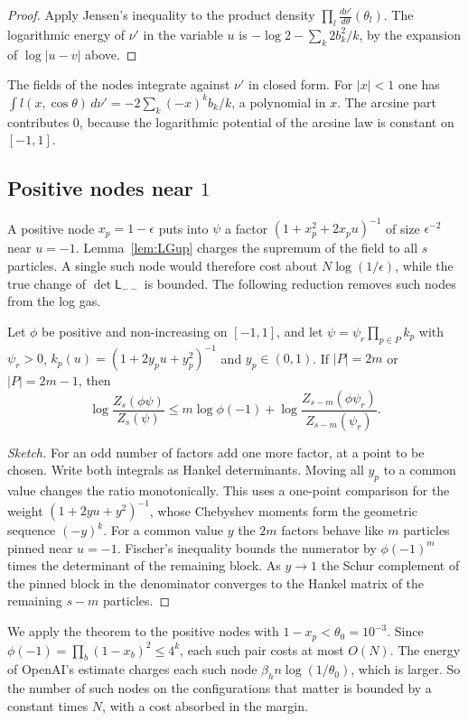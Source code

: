 \begin{proof}
Apply Jensen's inequality to the product density $\prod_l\frac{d\nu'}{d\theta}(\theta_l)$. The logarithmic
energy of $\nu'$ in the variable $u$ is $-\log2-\sum_k2b_k^2/k$, by the expansion of $\log|u-v|$ above.
\end{proof}

The fields of the nodes integrate against $\nu'$ in closed form. For $|x|<1$ one has
$\int l(x,\cos\theta)\,d\nu'=-2\sum_k(-x)^kb_k/k$, a polynomial in $x$. The arcsine part contributes $0$,
because the logarithmic potential of the arcsine law is constant on $[-1,1]$.

\subsection{Positive nodes near $1$}\label{ssec:spikes}
A positive node $x_p=1-\epsilon$ puts into $\psi$ a factor $(1+x_p^2+2x_pu)^{-1}$ of size $\epsilon^{-2}$ near
$u=-1$. Lemma~\ref{lem:LGup} charges the supremum of the field to all $s$ particles. A single such node
would therefore cost about $N\log(1/\epsilon)$, while the true change of $\det\mathsf L_{--}$ is bounded. The
following reduction removes such nodes from the log gas.

\begin{theorem}\label{thm:spike}
Let $\phi$ be positive and non-increasing on $[-1,1]$, and let $\psi=\psi_r\prod_{p\in P}k_p$ with $\psi_r>0$,
$k_p(u)=(1+2y_pu+y_p^2)^{-1}$ and $y_p\in(0,1)$. If $|P|=2m$ or $|P|=2m-1$, then
\[
 \log\frac{Z_s(\phi\psi)}{Z_s(\psi)}\le m\log\phi(-1)+\log\frac{Z_{s-m}(\phi\psi_r)}{Z_{s-m}(\psi_r)} .
\]
\end{theorem}

\begin{proof}[Sketch]
For an odd number of factors add one more factor, at a point to be chosen. Write both integrals as Hankel
determinants. Moving all $y_p$ to a common value changes the ratio monotonically. This uses a one-point
comparison for the weight $(1+2yu+y^2)^{-1}$, whose Chebyshev moments form the geometric sequence $(-y)^k$.
For a common value $y$ the $2m$ factors behave like $m$ particles pinned near $u=-1$. Fischer's inequality
bounds the numerator by $\phi(-1)^m$ times the determinant of the remaining block. As $y\to1$ the Schur
complement of the pinned block in the denominator converges to the Hankel matrix of the remaining
$s-m$ particles.
\end{proof}

We apply the theorem to the positive nodes with $1-x_p<\theta_0=10^{-3}$. Since $\phi(-1)=\prod_b(1-x_b)^2\le
4^k$, each such pair costs at most $O(N)$. The energy of OpenAI's estimate charges each such node
$\beta_hn\log(1/\theta_0)$, which is larger. So the number of such nodes on the configurations that matter
is bounded by a constant times $N$, with a cost absorbed in the margin.

